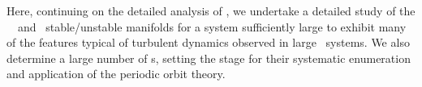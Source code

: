Here, continuing on the detailed analysis of
, we undertake a detailed study of the 
\KS\ \eqva\ and \reqva\ stable/unstable manifolds
for a system sufficiently large to exhibit many of
the features typical of turbulent dynamics observed in large \KS\ systems.
We also determine a large number of \rpo s, setting the
stage for their systematic enumeration and application 
of the periodic orbit theory.




